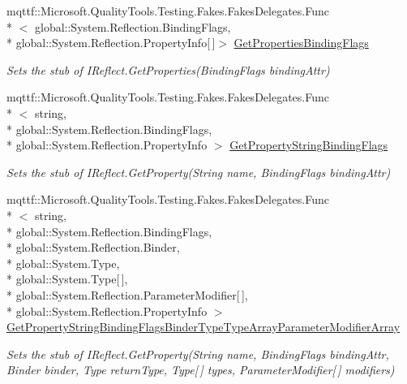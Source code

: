 \begin{DoxyCompactItemize}
mqttf\-::\-Microsoft.\-Quality\-Tools.\-Testing.\-Fakes.\-Fakes\-Delegates.\-Func\\*
$<$ global\-::\-System.\-Reflection.\-Binding\-Flags, \\*
global\-::\-System.\-Reflection.\-Property\-Info\mbox{[}$\,$\mbox{]}$>$ \hyperlink{class_system_1_1_runtime_1_1_interop_services_1_1_expando_1_1_fakes_1_1_stub_i_expando_a1eef8a29c380f4200e153da0aa322230}{Get\-Properties\-Binding\-Flags}
\begin{DoxyCompactList}\small\item\em Sets the stub of I\-Reflect.\-Get\-Properties(\-Binding\-Flags binding\-Attr)\end{DoxyCompactList}\item 
mqttf\-::\-Microsoft.\-Quality\-Tools.\-Testing.\-Fakes.\-Fakes\-Delegates.\-Func\\*
$<$ string, \\*
global\-::\-System.\-Reflection.\-Binding\-Flags, \\*
global\-::\-System.\-Reflection.\-Property\-Info $>$ \hyperlink{class_system_1_1_runtime_1_1_interop_services_1_1_expando_1_1_fakes_1_1_stub_i_expando_a23789f330b665a31802dbaa76635a22f}{Get\-Property\-String\-Binding\-Flags}
\begin{DoxyCompactList}\small\item\em Sets the stub of I\-Reflect.\-Get\-Property(\-String name, Binding\-Flags binding\-Attr)\end{DoxyCompactList}\item 
mqttf\-::\-Microsoft.\-Quality\-Tools.\-Testing.\-Fakes.\-Fakes\-Delegates.\-Func\\*
$<$ string, \\*
global\-::\-System.\-Reflection.\-Binding\-Flags, \\*
global\-::\-System.\-Reflection.\-Binder, \\*
global\-::\-System.\-Type, \\*
global\-::\-System.\-Type\mbox{[}$\,$\mbox{]}, \\*
global\-::\-System.\-Reflection.\-Parameter\-Modifier\mbox{[}$\,$\mbox{]}, \\*
global\-::\-System.\-Reflection.\-Property\-Info $>$ \hyperlink{class_system_1_1_runtime_1_1_interop_services_1_1_expando_1_1_fakes_1_1_stub_i_expando_adb5cc60aa5cdeace1c041cc6c387150a}{Get\-Property\-String\-Binding\-Flags\-Binder\-Type\-Type\-Array\-Parameter\-Modifier\-Array}
\begin{DoxyCompactList}\small\item\em Sets the stub of I\-Reflect.\-Get\-Property(\-String name, Binding\-Flags binding\-Attr, Binder binder, Type return\-Type, Type\mbox{[}$\,$\mbox{]} types, Parameter\-Modifier\mbox{[}$\,$\mbox{]} modifiers)\end{DoxyCompactList}\item 

\end{DoxyCompactItemize}
